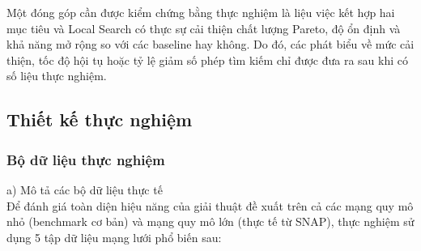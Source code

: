 \documentclass[14pt,a4paper]{extarticle}
\begin{document}
Một đóng góp cần được kiểm chứng bằng thực nghiệm là liệu việc kết hợp hai mục tiêu và Local Search có thực sự cải thiện chất lượng Pareto, độ ổn định và khả năng mở rộng so với các baseline hay không. Do đó, các phát biểu về mức cải thiện, tốc độ hội tụ hoặc tỷ lệ giảm số phép tìm kiếm chỉ được đưa ra sau khi có số liệu thực nghiệm.

\subsection{Thiết kế thực nghiệm}

\subsubsection{Bộ dữ liệu thực nghiệm}

\noindent a) Mô tả các bộ dữ liệu thực tế \\ \indent
Để đánh giá toàn diện hiệu năng của giải thuật đề xuất trên cả các mạng quy mô nhỏ (benchmark cơ bản) và mạng quy mô lớn (thực tế từ SNAP), thực nghiệm sử dụng 5 tập dữ liệu mạng lưới phổ biến sau:
\end{document}
